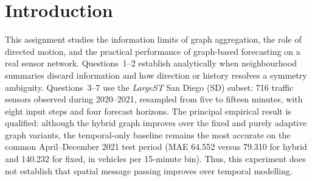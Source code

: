 \documentclass[11pt,a4paper]{article}
\begin{document}
\begin{titlepage}
\centering
\vspace*{2.2cm}
{\large Deep Learning for Space Time Graph\par}
\vspace{0.55cm}
{\large Assignment 3\par}
\vspace{1.65cm}
{\bfseries\large What Does a Sum Remember? Direction of Slowdown,\\[3pt] and Spatio-Temporal Traffic Forecasting on LargeST-SD\par}
\vspace{1.20cm}
{\small\textbf{Public code repository }\par}
\vspace{0.25cm}
\url{https://github.com/mubeenahmed-ai/AI651-Programming-Assignment-3} \par}
\vspace{1.55cm}
{Mubeen Ahmed\par}
\vspace{0.25cm}
{Student ID: 25280101\par}
\vspace{0.42cm}
{Fall 2026\par}
\vspace{0.30cm}
{November 22, 2026\par}
\vfill
\end{titlepage}
\setcounter{page}{1}

\section{Introduction}
This assignment studies the information limits of graph aggregation, the role of directed motion, and the practical performance of graph-based forecasting on a real sensor network. Questions~1--2 establish analytically when neighbourhood summaries discard information and how direction or history resolves a symmetry ambiguity. Questions~3--7 use the \textit{LargeST} San Diego (SD) subset: 716 traffic sensors observed during 2020--2021, resampled from five to fifteen minutes, with eight input steps and four forecast horizons.  The principal empirical result is qualified: although the hybrid graph improves over the fixed and purely adaptive graph variants, the temporal-only baseline remains the most accurate on the common April--December 2021 test period (MAE 64.552 versus 79.310 for hybrid and 140.232 for fixed, in vehicles per 15-minute bin). Thus, this experiment does not establish that spatial message passing improves over temporal modelling. 
\end{document}
